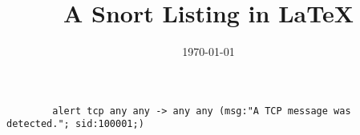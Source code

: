 \documentclass{article}
\begin{document}
    
    \title{A Snort Listing in \LaTeX}
    \date{\today}
    \maketitle
    
    \begin{lstlisting}
	    alert tcp any any -> any any (msg:"A TCP message was detected."; sid:100001;)
    \end{lstlisting}
    
	
\end{document}
